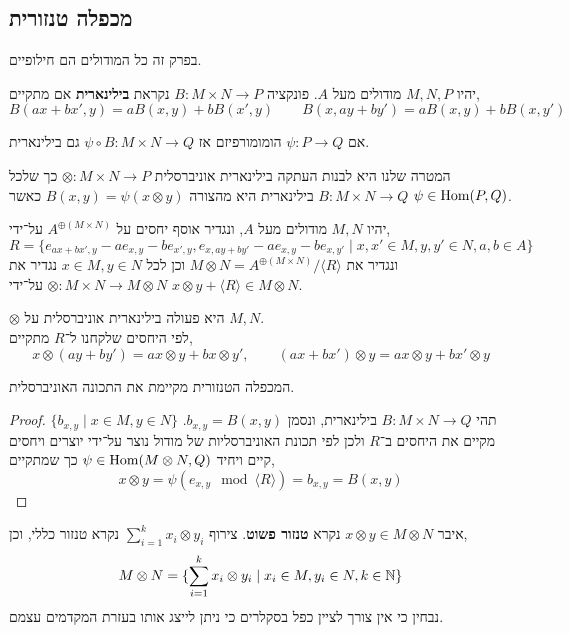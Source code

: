 \subsection{מכפלה טנזורית}
בפרק זה כל המודולים הם חילופיים.
\begin{definition}
	יהיו $M, N, P$ מודולים מעל $A$.
	פונקציה $B : M \times N \to P$ נקראת \textbf{בילינארית} אם מתקיים,
	\[
		B(a x + b x', y)
		= a B(x, y) + b B(x', y)
		\qquad
		B(x, a y + b y')
		= a B(x, y) + b B(x, y')
	\]
\end{definition}
\begin{remark}
	אם $\psi : P \to Q$ הומומורפיזם אז $\psi \circ B : M \times N \to Q$ גם בילינארית.
\end{remark}
המטרה שלנו היא לבנות העתקה בילינארית אוניברסלית $\otimes : M \times N \to P$ כך שלכל $B : M \times N \to Q$ בילינארית היא מהצורה $B(x, y) = \psi(x \otimes y)$ כאשר $\psi \in \operatorname{Hom}(P, Q)$.
\begin{definition}
	יהיו $M, N$ מודולים מעל $A$, ונגדיר אוסף יחסים על $A^{\oplus(M \times N)}$ על־ידי,
	\[
		R
		= \{ e_{a x + b x', y} - a e_{x, y} - b e_{x', y}, e_{x, a y + b y'} - a e_{x, y} - b e_{x, y'} \mid x, x' \in M, y, y' \in N, a, b \in A \}
	\]
	ונגדיר את $M \otimes N = A^{\oplus(M \times N)} / \langle R \rangle$ וכן לכל $x \in M, y \in N$ נגדיר את $\otimes : M \times N \to M \otimes N$ על־ידי $x \otimes y + \langle R \rangle \in M \otimes N$.
\end{definition}
\begin{proposition}
	$\otimes$ היא פעולה בילינארית אוניברסלית על $M, N$. \\
	לפי היחסים שלקחנו ל־$R$ מתקיים,
	\[
		x \otimes (a y + b y')
		= a x \otimes y + b x \otimes y',
		\qquad
		(a x + b x') \otimes y
		= a x \otimes y + b x' \otimes y
	\]
\end{proposition}
\begin{proposition}
	המכפלה הטנזורית מקיימת את התכונה האוניברסלית.
\end{proposition}
\begin{proof}
	תהי $B : M \times N \to Q$ בילינארית, ונסמן $b_{x, y} = B(x, y)$.
	$\{ b_{x, y} \mid x \in M, y \in N \}$ מקיים את היחסים ב־$R$ ולכן לפי תכונת האוניברסליות של מודול נוצר על־ידי יוצרים ויחסים קיים ויחיד $\psi \in \operatorname{Hom}(M \otimes N, Q)$ כך שמתקיים,
	\[
		x \otimes y
		= \psi(e_{x, y} \mod \langle R \rangle)
		= b_{x, y}
		= B(x, y)
	\]
\end{proof}
\begin{notation}
	איבר $x \otimes y \in M \otimes N$ נקרא \textbf{טנזור פשוט}.
	צירוף $\sum_{i = 1}^k x_i \otimes y_i$ נקרא טנזור כללי, וכן,
	\[
		M \otimes N
		= \{ \sum_{i = 1}^k x_i \otimes y_i \mid x_i \in M, y_i \in N, k \in \mathbb{N} \}
	\]
	נבחין כי אין צורך לציין כפל בסקלרים כי ניתן לייצג אותו בעזרת המקדמים עצמם.
\end{notation}
